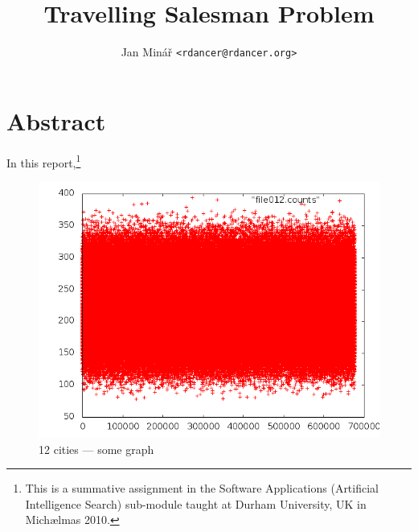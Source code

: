 \documentclass[10pt,twocolumn]{article}
\author{Jan Minář {\tt <rdancer@rdancer.org>}}
\title{Travelling Salesman Problem}
\begin{document}

\setcounter{section}{-1}  %

\maketitle



\section{Abstract}
\thispagestyle{fancy}

In this report,\footnote{This is a summative assignment in the Software Applications (Artificial Intelligence Search) sub-module taught at Durham University, UK in Michælmas 2010.}

\begin{figure}

	    \includegraphics[width=0.3\paperwidth]{file012.png}

    \caption{
	12 cities --- some graph
    }
    \label{file012}
\end{figure}



\pagebreak

\nocite{Russell2003}


\thispagestyle{fancy}
\end{document}
